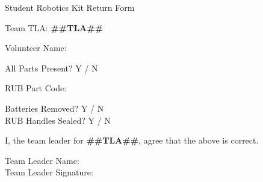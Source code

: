 \documentclass[a4paper, 12pt]{article}
\begin{document}
\begin{center}

    {\huge{Student Robotics Kit Return Form}}

    \medskip

\end{center}

\bigskip

{\Large{Team TLA: \textbf{##TLA##}}} \\

\medskip

{\large{Volunteer Name}: \hrulefill} \\

\bigskip

{\large{All Parts Present?} \huge{Y / N}} \\

\bigskip

{\large{RUB Part Code}: \hrulefill} \\

\bigskip

{\large{Batteries Removed?} \huge{Y / N}} \\

\bigskip
{\large{RUB Handles Sealed?} \huge{Y / N}} \\

\vspace*{\fill}

I, the team leader for \textbf{##TLA##}, agree that the above is correct. \\

\bigskip

{\large{Team Leader Name}: \hrulefill} \\

{\large{Team Leader Signature}: \hrulefill} \\
\end{document}
